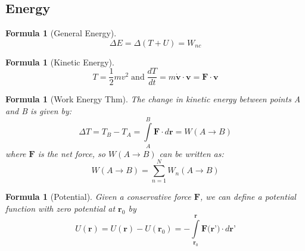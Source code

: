 \documentclass[12pt]{article}
\newtheorem{for}[thm]{Formula}
\theoremstyle{definition}
\theoremstyle{remark}
\numberwithin{equation}{section}
\newcommand\B[1]{\textbf{#1}}
\begin{document}
\vspace{15pt}


\subsection{Energy}


\begin{for}[General Energy]
        \begin{equation}
                \Delta E = \Delta(T + U) = W_{nc}
        \end{equation}
\end{for}

\vspace{15pt}

\begin{for}[Kinetic Energy]
        \begin{equation}
                T = \frac{1}{2}mv^2\;\text{and}\;\frac{dT}{dt} = m\dot{\B{v}}\cdot\B{v} = \B{F} \cdot\B{v}
        \end{equation}
\end{for}


\vspace{15pt}

\begin{for}[Work Energy Thm]
        The change in kinetic energy between points A and B is given by:
        \begin{equation}
                \Delta T = T_B - T_A = \int\limits_{A}^B\B{F}\cdot d\B{r} = W(A\rightarrow B)
        \end{equation}
        where $\B{F}$ is the net force, so $W(A\rightarrow B)$ can be written as:
        \begin{equation}
                W(A\rightarrow B) = \sum\limits_{n=1}^NW_n(A\rightarrow B)
        \end{equation}
\end{for}


\vspace{15pt}


\begin{for}[Potential]
        Given a conservative force $\B{F}$, we can define a potential function with zero potential at $\B{r}_0$ by \begin{equation}
                U(\B{r}) = U(\B{r}) - U(\B{r}_0) = -\int\limits_{\B{r}_0}^{\B{r}}\B{F(r')}\cdot d\B{r'}
        \end{equation}
\end{for}

\vspace{15pt}
\end{document}
